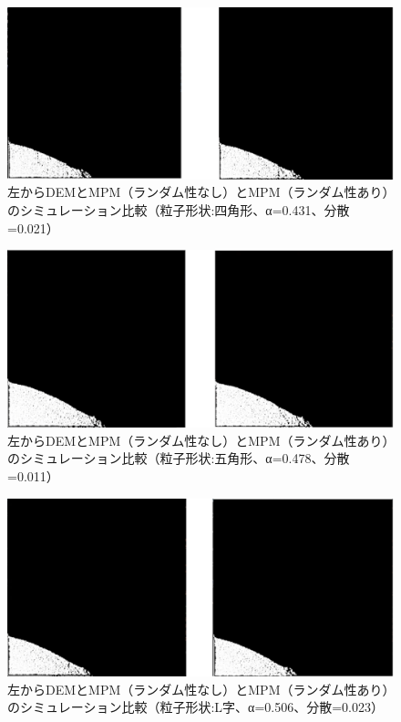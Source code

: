 \documentclass[12pt]{ltjsarticle}
\begin{document}
\begin{figure}[htbp]
  \centering
  \includegraphics*[keepaspectratio, scale=0.35]{square_hikaku.PNG}
  \caption{左からDEMとMPM（ランダム性なし）とMPM（ランダム性あり）のシミュレーション比較（粒子形状:四角形、α=0.431、分散=0.021）}
  \label{hikaku_square}
\end{figure}

\begin{figure}[htbp]
  \centering
  \includegraphics*[keepaspectratio, scale=0.35]{pentagon_hikaku.PNG}
  \caption{左からDEMとMPM（ランダム性なし）とMPM（ランダム性あり）のシミュレーション比較（粒子形状:五角形、α=0.478、分散=0.011）}
  \label{hikaku_pentagon}
\end{figure}

\clearpage

\begin{figure}[htbp]
  \centering
  \includegraphics*[keepaspectratio, scale=0.35]{L_hikaku.PNG}
  \caption{左からDEMとMPM（ランダム性なし）とMPM（ランダム性あり）のシミュレーション比較（粒子形状:L字、α=0.506、分散=0.023）}
  \label{hikaku_L}
\end{figure}
\end{document}
